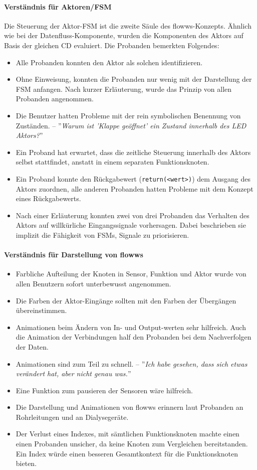 \paragraph{Verständnis für Aktoren/\ac{FSM}} Die Steuerung der Aktor-\ac{FSM} ist die zweite Säule des flowws-Konzepts. Ähnlich wie bei der Datenfluss-Komponente, wurden die Komponenten des Aktors auf Basis der gleichen \ac{CD} evaluiert. Die Probanden bemerkten Folgendes:
\begin{itemize}
    \item Alle Probanden konnten den Aktor als solchen identifizieren.
    \item Ohne Einweisung, konnten die Probanden nur wenig mit der Darstellung der \ac{FSM} anfangen. Nach kurzer Erläuterung, wurde das Prinzip von allen Probanden angenommen.
    \item Die Benutzer hatten Probleme mit der rein symbolischen Benennung von Zuständen. -- ''\textit{Warum ist 'Klappe geöffnet' ein Zustand innerhalb des LED Aktors?}'' 
    \item Ein Proband hat erwartet, dass die zeitliche Steuerung innerhalb des Aktors selbst stattfindet, anstatt in einem separaten Funktionsknoten.
    \item Ein Proband konnte den Rückgabewert (\texttt{return(<wert>)}) dem Ausgang des Aktors zuordnen, alle anderen Probanden hatten Probleme mit dem Konzept eines Rückgabewerts.
    \item Nach einer Erläuterung konnten zwei von drei Probanden das Verhalten des Aktors auf willkürliche Eingangssignale vorhersagen. Dabei beschrieben sie implizit die Fähigkeit von \acp{FSM}, Signale zu priorisieren.
\end{itemize}

\paragraph{Verständnis für Darstellung von flowws}
\begin{itemize}
    \item Farbliche Aufteilung der Knoten in Sensor, Funktion und Aktor wurde von allen Benutzern sofort unterbewusst angenommen.
    \item Die Farben der Aktor-Eingänge sollten mit den Farben der Übergängen übereinstimmen.
    \item Animationen beim Ändern von In- und Output-werten sehr hilfreich. Auch die Animation der Verbindungen half den Probanden bei dem Nachverfolgen der Daten.
    \item Animationen sind zum Teil zu schnell. -- ''\textit{Ich habe gesehen, dass sich etwas verändert hat, aber nicht genau was.}''
    \item Eine Funktion zum pausieren der Sensoren wäre hilfreich.
    \item Die Darstellung und Animationen von flowws erinnern laut Probanden an Rohrleitungen und an Dia\-lyse\-ge\-räte.    
    \item Der Verlust eines Indexes, mit sämtlichen Funktionsknoten machte einen einen Probanden unsicher, da keine Knoten zum Vergleichen bereitstanden. Ein Index würde einen besseren Gesamtkontext für die Funktionsknoten bieten. 
\end{itemize}


